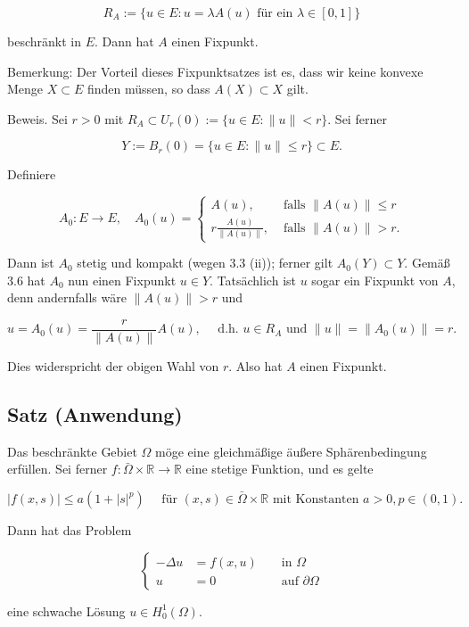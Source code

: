 \documentclass[10pt, letterpaper]{article}
\begin{document}
$$
R_{A}:=\{u \in E: u=\lambda A(u) \text { für ein } \lambda \in[0,1]\}
$$

beschränkt in $E$. Dann hat $A$ einen Fixpunkt.

Bemerkung: Der Vorteil dieses Fixpunktsatzes ist es, dass wir keine konvexe Menge $X \subset E$ finden müssen, so dass $A(X) \subset X$ gilt.

Beweis. Sei $r>0$ mit $R_{A} \subset U_{r}(0):=\{u \in E:\|u\|<r\}$. Sei ferner

$$
Y:=B_{r}(0)=\{u \in E:\|u\| \leq r\} \subset E .
$$

Definiere

$$
A_{0}: E \rightarrow E, \quad A_{0}(u)= \begin{cases}A(u), & \text { falls }\|A(u)\| \leq r \\ r \frac{A(u)}{\|A(u)\|}, & \text { falls }\|A(u)\|>r .\end{cases}
$$

Dann ist $A_{0}$ stetig und kompakt (wegen 3.3 (ii)); ferner gilt $A_{0}(Y) \subset Y$. Gemäß 3.6 hat $A_{0}$ nun einen Fixpunkt $u \in Y$. Tatsächlich ist $u$ sogar ein Fixpunkt von $A$, denn andernfalls wäre $\|A(u)\|>r$ und

$$
u=A_{0}(u)=\frac{r}{\|A(u)\|} A(u), \quad \text { d.h. } u \in R_{A} \text { und }\|u\|=\left\|A_{0}(u)\right\|=r \text {. }
$$

Dies widerspricht der obigen Wahl von $r$. Also hat $A$ einen Fixpunkt.

\subsection*{Satz (Anwendung)}

Das beschränkte Gebiet $\Omega$ möge eine gleichmäßige äußere Sphärenbedingung erfüllen. Sei ferner $f: \bar{\Omega} \times \mathbb{R} \rightarrow \mathbb{R}$ eine stetige Funktion, und es gelte

$$
|f(x, s)| \leq a\left(1+|s|^{p}\right) \quad \text { für }(x, s) \in \bar{\Omega} \times \mathbb{R} \text { mit Konstanten } a>0, p \in(0,1) \text {. }
$$

Dann hat das Problem

$$
\left\{\begin{aligned}
-\Delta u & =f(x, u) & & \text { in } \Omega \\
u & =0 & & \text { auf } \partial \Omega
\end{aligned}\right.
$$

eine schwache Lösung $u \in H_{0}^{1}(\Omega)$.
\end{document}
